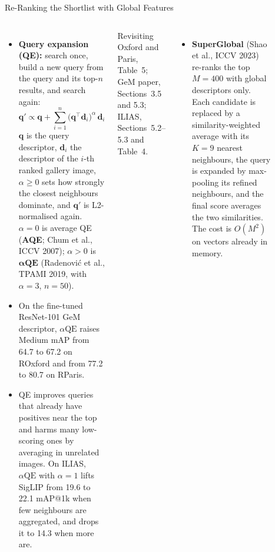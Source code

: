 \begin{frame}{Re-Ranking the Shortlist with Global Features}
  \begin{columns}[T,onlytextwidth]
      \begin{itemize}\scriptsize\itemsep0.3em
        \item \textbf{Query expansion (QE):} search once, build a new query from the query and its top-$n$ results, and search again:
        \[ \mathbf{q}' \propto \mathbf{q} + \sum_{i=1}^{n} \big(\mathbf{q}^{\top}\mathbf{d}_i\big)^{\alpha}\, \mathbf{d}_i \]
        $\mathbf{q}$ is the query descriptor, $\mathbf{d}_i$ the descriptor of the $i$-th ranked gallery image, $\alpha \geq 0$ sets how strongly the closest neighbours dominate, and $\mathbf{q}'$ is L2-normalised again. $\alpha = 0$ is average QE (\textbf{AQE}; Chum et al., ICCV 2007); $\alpha > 0$ is $\boldsymbol{\alpha}\mathbf{QE}$ (Radenovi\'c et al., TPAMI 2019, with $\alpha = 3$, $n = 50$).
        \item On the fine-tuned ResNet-101 GeM descriptor, $\alpha\mathrm{QE}$ raises Medium mAP from 64.7 to 67.2 on ROxford and from 77.2 to 80.7 on RParis.
        \item QE improves queries that already have positives near the top and harms many low-scoring ones by averaging in unrelated images. On ILIAS, $\alpha\mathrm{QE}$ with $\alpha = 1$ lifts SigLIP from 19.6 to 22.1 mAP@1k when few neighbours are aggregated, and drops it to 14.3 when more are.
      \end{itemize}
      \vspace{0.1em}
      {\scriptsize Revisiting Oxford and Paris, Table~5; GeM paper, Sections~3.5 and 5.3; ILIAS, Sections~5.2--5.3 and Table~4.\par}
      \begin{itemize}\scriptsize\itemsep0.3em
        \item \textbf{SuperGlobal} (Shao et al., ICCV 2023) re-ranks the top $M = 400$ with global descriptors only. Each candidate is replaced by a similarity-weighted average with its $K = 9$ nearest neighbours, the query is expanded by max-pooling its refined neighbours, and the final score averages the two similarities. The cost is $O(M^2)$ on vectors already in memory.
      \end{itemize}
      \vspace{0.2em}
      {\centering\scriptsize\setlength{\tabcolsep}{3pt}
      \begin{tabular}{@{}lccc@{}}

\end{tabular}}
\end{columns}
\end{frame}
